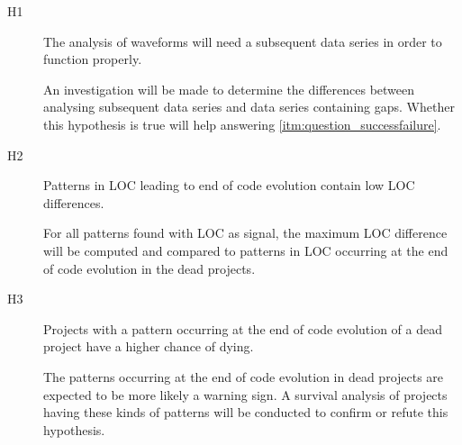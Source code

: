 \begin{description}
	\item[H1\label{hyp:subsequent_data}] \hspace{0em}
	The analysis of waveforms will need a subsequent data series in order
	to function properly.

	An investigation will be made to determine the differences between analysing
	subsequent data series and data series containing gaps. Whether this
	hypothesis is true will help answering \ref{itm:question_successfailure}.

	\item[H2\label{hyp:pattern_low_diff}] \hspace{0em}
	Patterns in LOC leading to end of code evolution contain low LOC differences.

	For all patterns found with LOC as signal, the maximum LOC difference will be
	computed and compared to patterns in LOC occurring at the end of code
	evolution in the dead projects.
	
	\item[H3\label{hyp:pattern_types}] \hspace{0em}
	Projects with a pattern occurring at the end of code evolution of a dead
	project have a higher chance of dying.

	The patterns occurring at the end of code evolution in dead projects are
	expected to be more likely a warning sign. A survival analysis of projects
	having these kinds of patterns will be conducted to confirm or refute this
	hypothesis.
\end{description}

\begin{comment}
- The plan
- Methodology / method per question
- Hypotheses
- Validation

This section describes the methods used to answer the research questions. A
good structure of this section often follows the sub questions by providing a
method for each.

The research method can be based on the “Scientific method”, but more creative
solutions could be defined as well. In any case, the method needs a thorough
motivation grounded in theory in order to be acceptable.

As part of the method a number of hypotheses are described. These hypotheses
will be tested by the research, using the methods described here.

An important part of this section is validation. How will you evaluate and
validate the outcomes of the research? You can look at Paul Klint’s homepage
for examples of this section as
well\footnote{http://homepages.cwi.nl/~paulk/thesesMasterSoftwareEngineering/2006/RichardKettelerij.pdf}.
\end{comment}